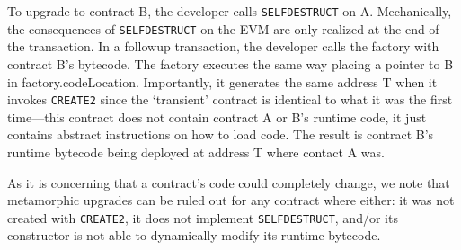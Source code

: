 To upgrade to contract B, the developer calls \texttt{SELFDESTRUCT} on A. Mechanically, the consequences of \texttt{SELFDESTRUCT} on the EVM are only realized at the end of the transaction. In a followup transaction, the developer calls the factory with contract B's bytecode. The factory executes the same way placing a pointer to B in factory.codeLocation. Importantly, it generates the same address T when it invokes \texttt{CREATE2} since the `transient' contract is identical to what it was the first time---this contract does not contain contract A or B's runtime code, it just contains abstract instructions on how to load code. The result is contract B's runtime bytecode being deployed at address T where contact A was. 
 

As it is concerning that a contract's code could completely change, we note that metamorphic upgrades can be ruled out for any contract where either: it was not created with \texttt{CREATE2}, it does not implement \texttt{SELFDESTRUCT}, and/or its constructor is not able to dynamically modify its runtime bytecode. 



